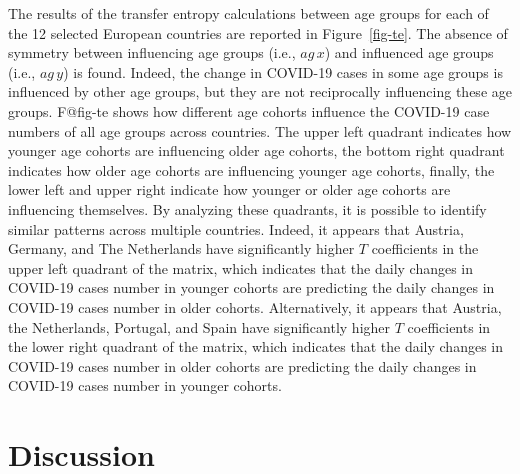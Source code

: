 \documentclass[Harvard,Times1COL]{WileyNJDv5}
\begin{document}
{The results of the transfer entropy calculations between age groups for
each of the 12 selected European countries are reported in
Figure~\ref{fig-te}. The absence of symmetry between influencing age
groups (i.e., \(ag\,x\)) and influenced age groups (i.e., \(ag\,y\)) is
found. Indeed, the change in COVID-19 cases in some age groups is
influenced by other age groups, but they are not reciprocally
influencing these age groups. F@fig-te shows how different age cohorts
influence the COVID-19 case numbers of all age groups across countries.
The upper left quadrant indicates how younger age cohorts are
influencing older age cohorts, the bottom right quadrant indicates how
older age cohorts are influencing younger age cohorts, finally, the
lower left and upper right indicate how younger or older age cohorts are
influencing themselves. By analyzing these quadrants, it is possible to
identify similar patterns across multiple countries. Indeed, it appears
that Austria, Germany, and The Netherlands have significantly higher
\(T\) coefficients in the upper left quadrant of the matrix, which
indicates that the daily changes in COVID-19 cases number in younger
cohorts are predicting the daily changes in COVID-19 cases number in
older cohorts. Alternatively, it appears that Austria, the Netherlands,
Portugal, and Spain have significantly higher \(T\) coefficients in the
lower right quadrant of the matrix, which indicates that the daily
changes in COVID-19 cases number in older cohorts are predicting the
daily changes in COVID-19 cases number in younger cohorts.

\section{Discussion}\label{discussion}

}
\end{document}
